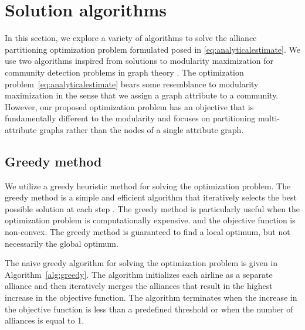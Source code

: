 \documentclass[preprint,times]{elsarticle}
\def\mkhalil#1{{\color{black} #1}}
\begin{document}
\section{Solution algorithms} \label{sec:algorithms}

In this section, we explore a variety of algorithms to solve the alliance partitioning optimization problem formulated posed in \eqref{eq:analyticalestimate}. We use two algorithms inspired from solutions to modularity maximization for community detection problems in graph theory \citep{Clauset2004,FortHric16,Aref2022}. The optimization problem~\eqref{eq:analyticalestimate} bears some resemblance to modularity maximization in the sense that we assign a graph attribute to a community. However, our proposed optimization problem has an objective that is fundamentally different to the modularity and focuses on partitioning multi-attribute graphs rather than the nodes of a single attribute graph.

\subsection{Greedy method}\label{subsec:greedy}

We utilize a greedy heuristic method for solving the optimization problem. The greedy method is a simple and efficient algorithm that iteratively selects the best possible solution at each step \citep{Clauset2004}. The greedy method is particularly useful when the optimization problem is computationally expensive.
%
and the objective function is non-convex. 
%
The greedy method is guaranteed to find a local optimum, but not necessarily the global optimum.

The naive greedy algorithm for solving the optimization problem is given in Algorithm~\ref{alg:greedy}. The algorithm initializes each \mkhalil{airline} as a separate \mkhalil{alliance} and then iteratively merges the \mkhalil{alliance}s that result in the highest increase in the objective function. The algorithm terminates when the increase in the objective function is less than a predefined threshold or when the number of \mkhalil{alliance}s is \mkhalil{equal to} 1.
\end{document}
